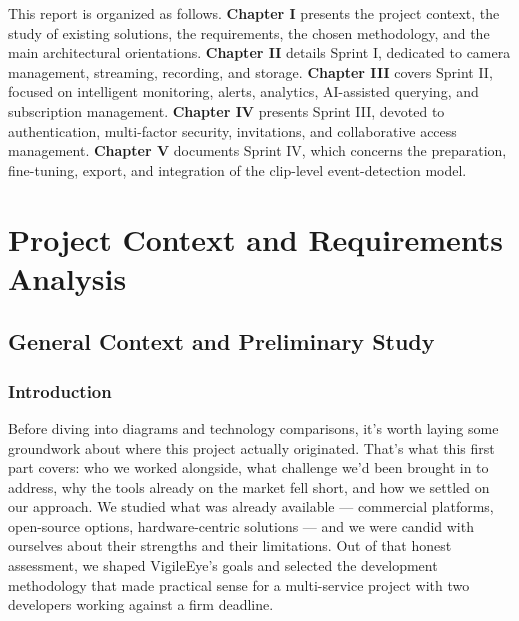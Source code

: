 \documentclass[12pt,a4paper,oneside]{report}
\begin{document}
\hspace{0.8cm}This report is organized as follows. \textbf{Chapter I} presents the project context, the study of existing solutions, the requirements, the chosen methodology, and the main architectural orientations. \textbf{Chapter II} details Sprint I, dedicated to camera management, streaming, recording, and storage. \textbf{Chapter III} covers Sprint II, focused on intelligent monitoring, alerts, analytics, AI-assisted querying, and subscription management. \textbf{Chapter IV} presents Sprint III, devoted to authentication, multi-factor security, invitations, and collaborative access management. \textbf{Chapter V} documents Sprint IV, which concerns the preparation, fine-tuning, export, and integration of the clip-level event-detection model.


\chapter{Project Context and Requirements Analysis}
\label{chap:context}

\section{General Context and Preliminary Study}
\label{sec:general_context}

\subsection*{Introduction}

\hspace{0.8cm}Before diving into diagrams and technology comparisons, it's worth laying some groundwork about where this project actually originated. That's what this first part covers: who we worked alongside, what challenge we'd been brought in to address, why the tools already on the market fell short, and how we settled on our approach. We studied what was already available — commercial platforms, open-source options, hardware-centric solutions — and we were candid with ourselves about their strengths and their limitations. Out of that honest assessment, we shaped VigileEye's goals and selected the development methodology that made practical sense for a multi-service project with two developers working against a firm deadline.
\end{document}
